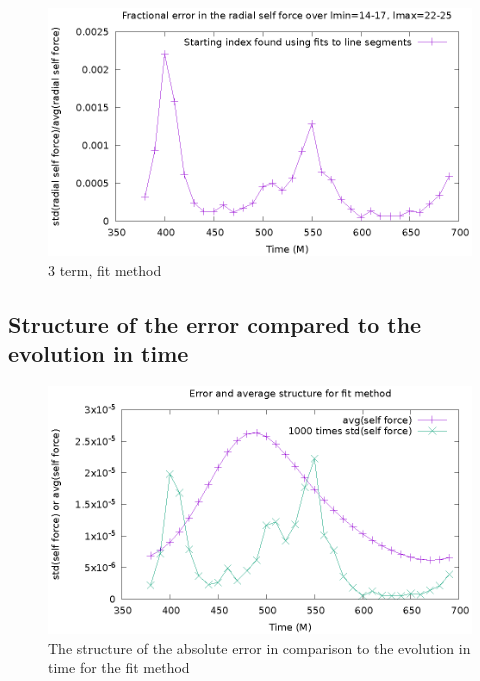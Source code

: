 \begin{figure}
  \includegraphics{fractionalErrorOverTimeFits}
  \caption{3 term, fit method}
\end{figure}

\subsection{Structure of the error compared to the evolution in time}
\begin{figure}
  \includegraphics{structErrFitMethod}
  \caption{The structure of the absolute error in comparison to the evolution in time for the fit method}
\end{figure}






